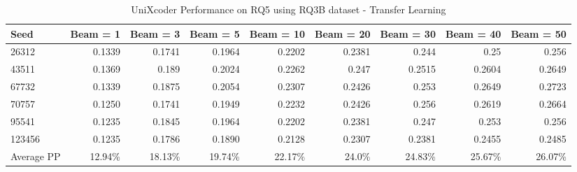 \begin{table}[H]
\centering
  \caption{UniXcoder Performance on RQ5 using RQ3B dataset - Transfer Learning}
  \label{Appendices:RQ5-finetrain-UniXcoder}
  \begin{tabular}{|l|r|r|r|r|r|r|r|r|}
    \hline
    Seed          & Beam = 1          & Beam = 3           & Beam = 5          & Beam = 10   & Beam = 20     & Beam = 30     & Beam = 40              & Beam = 50\\
    \hline
    26312          & 0.1339            & 0.1741             & 0.1964            & 0.2202     & 0.2381        & 0.244         & 0.25                   & 0.256 \\
    \hline
    43511          & 0.1369            & 0.189              & 0.2024            & 0.2262     & 0.247         & 0.2515        & 0.2604                 & 0.2649 \\
    \hline
    67732          & 0.1339            & 0.1875             & 0.2054            & 0.2307     & 0.2426        & 0.253         & 0.2649                 & 0.2723 \\
    \hline
    70757          & 0.1250            & 0.1741             & 0.1949            & 0.2232     & 0.2426        & 0.256         & 0.2619                 & 0.2664 \\
    \hline
    95541          & 0.1235            & 0.1845             & 0.1964            & 0.2202     & 0.2381        & 0.247         & 0.253                  & 0.256 \\
    \hline
    123456         & 0.1235            & 0.1786             & 0.1890            & 0.2128     & 0.2307        & 0.2381        & 0.2455                 & 0.2485 \\
    \hline
    Average PP     & 12.94\%           & 18.13\%            & 19.74\%           & 22.17\%    & 24.0\%        & 24.83\%       & 25.67\%                & 26.07\% \\
    \hline
  \end{tabular}
\end{table}
%
%
%

\twocolumn